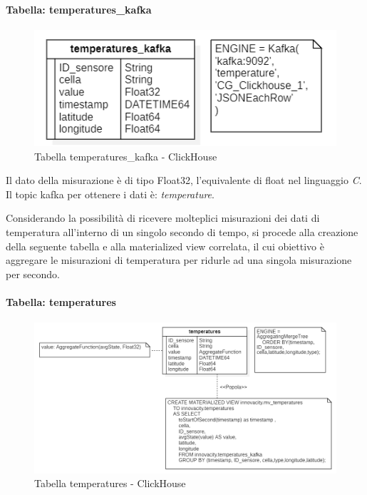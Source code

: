 \paragraph{Tabella: temperatures\_kafka}
\begin{figure}[H]
    \centering
    \includegraphics[width=1\textwidth]{../Images/SpecificaTecnica/temperatures_kafka.PNG}
    \caption{Tabella temperatures\_kafka - ClickHouse}
    \label{fig:temperaturesKafka}
  \end{figure}

Il dato della misurazione è di tipo Float32, l'equivalente di float nel linguaggio \textit{C}.
Il topic kafka per ottenere i dati è: \textit{temperature}.

Considerando la possibilità di ricevere molteplici misurazioni dei dati di temperatura all'interno di un singolo secondo di tempo, si procede alla creazione della seguente tabella e alla materialized view correlata, il cui obiettivo è aggregare le misurazioni di temperatura per ridurle ad una singola misurazione per secondo.

\paragraph{Tabella: temperatures}
\begin{figure}[H]
    \centering
    \includegraphics[width=1\textwidth]{../Images/SpecificaTecnica/temperatures.PNG}
    \caption{Tabella temperatures - ClickHouse}
    \label{fig:temperatures}
  \end{figure}

